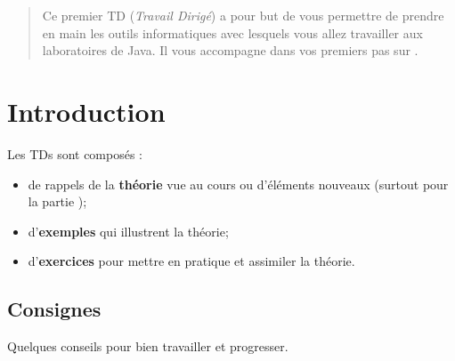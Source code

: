 \documentclass[11pt,a4paper]{article}
\begin{document}
            \begin{abstract}
			Ce premier TD 
			(\textit{Travail Dirig\'e}) 
			a pour but de vous permettre de prendre en main les outils informatiques 
			avec lesquels vous allez travailler aux laboratoires de Java. 
			Il vous accompagne dans vos premiers pas  
			sur \verb@Linux@.
		
            \par
        \end{abstract}
				\vspace{-2em}\tableofcontents
				\pagestyle{plain}
            \clearpage
            \fancyhead[L,C,R]{}
            \fancyfoot[L,C]{}
            \fancyfoot[R]{ \scriptsize{\textcolor{gray}{
				TD1 - page \thepage}}}
				\thispagestyle{fancy}
				\pagestyle{fancy}
	   
            \section{Introduction}
				Les TDs sont compos\'es :
			
            \par
        
					\begin{itemize}
				
			\item 
					de rappels de la \textbf{th\'eorie}
					vue au cours ou d'\'el\'ements nouveaux
					(surtout pour la partie \verb@Linux@); 
				
			\item 
					d'\textbf{exemples}
					qui illustrent la th\'eorie;
				
			\item 
					d'\textbf{exercices}
					pour mettre en pratique et assimiler la th\'eorie.
				
					\end{itemize}
				\subsection{Consignes}
				Quelques conseils pour bien travailler et progresser.
			
            \par
        
\end{document}

